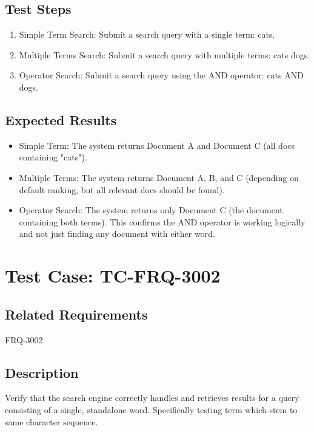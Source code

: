 \documentclass{article}
\begin{document}
\subsection*{Test Steps}
\begin{enumerate}
  \item Simple Term Search: Submit a search query with a single term: cats.
  \item Multiple Terms Search: Submit a search query with multiple terms: cats dogs.
  \item Operator Search: Submit a search query using the AND operator: cats AND dogs.
\end{enumerate}

\subsection*{Expected Results}
\begin{itemize}
  \item Simple Term: The system returns Document A and Document C (all docs containing "cats").
  \item Multiple Terms: The system returns Document A, B, and C (depending on default ranking, but all relevant docs should be found).
  \item Operator Search: The system returns only Document C (the document containing both terms). This confirms the AND operator is working logically and not just finding any document with either word.
\end{itemize}

\section{Test Case: TC-FRQ-3002}

\subsection*{Related Requirements}
FRQ-3002

\subsection*{Description}
Verify that the search engine correctly handles and retrieves results for a query consisting of a single, standalone word.
Specifically testing term which stem to same character sequence. 
\end{document}
